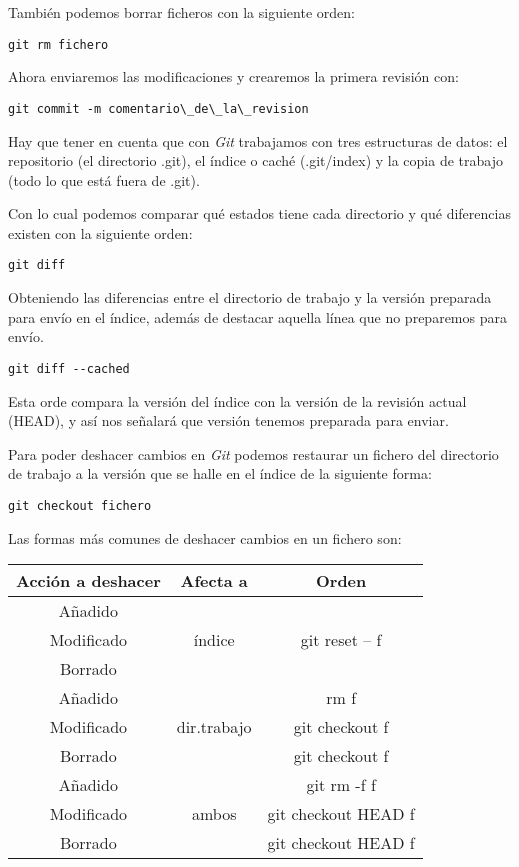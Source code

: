 También podemos borrar ficheros con la siguiente orden:
\begin{lstlisting}[style=consola]
  git rm fichero
\end{lstlisting}

Ahora enviaremos las modificaciones y crearemos la primera revisión
con:
\begin{lstlisting}[style=consola]
  git commit -m comentario\_de\_la\_revision
\end{lstlisting}

Hay que tener en cuenta que con \textit{Git} trabajamos con tres
estructuras de datos: el repositorio (el directorio .git), el índice o
caché (.git/index) y la copia de trabajo (todo lo que está fuera de .git).

Con lo cual podemos comparar qué estados tiene cada directorio y qué
diferencias existen con la siguiente orden:
\begin{lstlisting}[style=consola]
  git diff
\end{lstlisting}

Obteniendo las diferencias entre el directorio de trabajo y la versión
preparada para envío en el índice, además de destacar aquella línea
que no preparemos para envío.

\begin{lstlisting}[style=consola]
  git diff --cached
\end{lstlisting}

Esta orde compara la versión del índice con la versión de la revisión
actual (HEAD), y así nos señalará que versión tenemos preparada para
enviar.

Para poder deshacer cambios en \textit{Git} podemos restaurar un
fichero del directorio de trabajo a la versión que se halle en el
índice de la siguiente forma:
\begin{lstlisting}[style=consola]
  git checkout fichero
\end{lstlisting}

Las formas más comunes de deshacer cambios en un fichero son: \\
\begin{tabular}{c c c}
\hline
Acción a deshacer & Afecta a & Orden \\
\hline
Añadido & & \\ 
Modificado & índice & git reset -- f \\
Borrado & & \\
\hline
Añadido & &  rm f \\
Modificado & dir.trabajo & git checkout f \\
Borrado & & git checkout f \\
\hline
Añadido & & git rm -f f \\
Modificado & ambos & git checkout HEAD f \\
Borrado & & git checkout HEAD f \\
\hline
\end{tabular}

